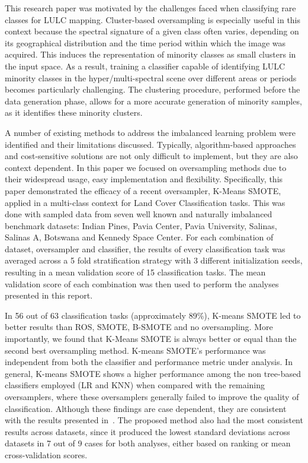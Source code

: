 \documentclass[authoryear,preprint,12pt]{elsarticle}
\begin{document}
\begin{linenumbers}
This research paper was motivated by the challenges faced when classifying
rare classes for LULC mapping. Cluster-based oversampling is especially useful
in this context because the spectral signature of a given class often varies,
depending on its geographical distribution and the time period within which
the image was acquired. This induces the representation of minority classes as
small clusters in the input space. As a result, training a classifier capable
of identifying LULC minority classes in the hyper/multi-spectral scene over
different areas or periods becomes particularly challenging. The clustering
procedure, performed before the data generation phase, allows for a more
accurate generation of minority samples, as it identifies these minority
clusters.

A number of existing methods to address the imbalanced learning problem were
identified and their limitations discussed. Typically, algorithm-based
approaches and cost-sensitive solutions are not only difficult to implement,
but they are also context dependent. In this paper we focused on oversampling
methods due to their widespread usage, easy implementation and flexibility.
Specifically, this paper demonstrated the efficacy of a recent oversampler,
K-Means SMOTE, applied in a multi-class context for Land Cover Classification
tasks. This was done with sampled data from seven well known and naturally
imbalanced benchmark datasets: Indian Pines, Pavia Center, Pavia University,
Salinas, Salinas A, Botswana and Kennedy Space Center. For each combination of
dataset, oversampler and classifier, the results of every classification task
was averaged across a 5 fold stratification strategy with 3 different
initialization seeds, resulting in a mean validation score of 15
classification tasks. The mean validation score of each combination was then
used to perform the analyses presented in this report.

In 56 out of 63 classification tasks (approximately 89\%), K-means SMOTE led
to better results than ROS, SMOTE, B-SMOTE and no oversampling. More
importantly, we found that K-Means SMOTE is always better or equal than the
second best oversampling method.  K-means SMOTE's performance was independent
from both the classifier and performance metric under analysis. In general,
K-means SMOTE shows a higher performance among the non tree-based classifiers
employed (LR and KNN) when compared with the remaining oversamplers, where
these oversamplers generally failed to improve the quality of classification.
Although these findings are case dependent, they are consistent with the
results presented in~\citep{Douzas2018}. The proposed method also had the most
consistent results across datasets, since it produced the lowest standard
deviations across datasets in 7 out of 9 cases for both analyses, either based
on ranking or mean cross-validation scores.


\end{linenumbers}
\end{document}
